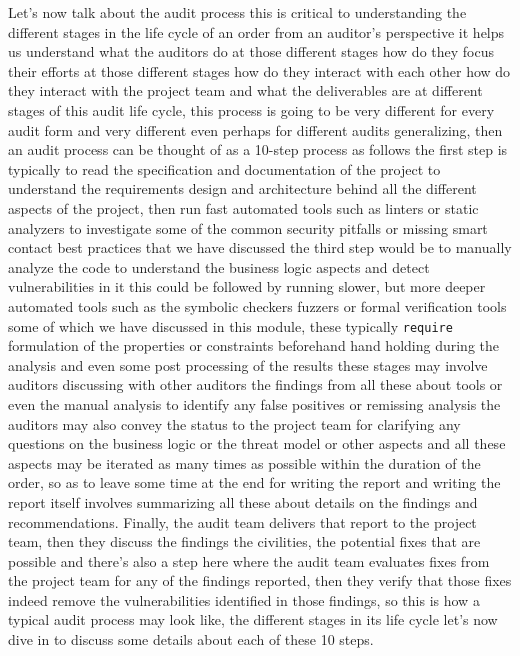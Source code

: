 Let's now talk about the audit process this is critical to understanding the different stages in the life cycle of an order from an auditor's perspective it helps us understand what the auditors do at those different stages how do they focus their efforts at those different stages how do they interact with each other how do they interact with the project team and what the deliverables are at different stages of this audit life cycle, this process is going to be very different for every audit form and very different even perhaps for different audits generalizing, then an audit process can be thought of as a 10-step process as follows the first step is typically to read the specification and documentation of the project to understand the requirements design and architecture behind all the different aspects of the project, then run fast automated tools such as linters or static analyzers to investigate some of the common security pitfalls or missing smart contact best practices that we have discussed the third step would be to manually analyze the code to understand the business logic aspects and detect vulnerabilities in it this could be followed by running slower, but more deeper automated tools such as the symbolic checkers fuzzers or formal verification tools some of which we have discussed in this module, these typically \verb|require| formulation of the properties or constraints beforehand hand holding during the analysis and even some post processing of the results these stages may involve auditors discussing with other auditors the findings from all these about tools or even the manual analysis to identify any false positives or remissing analysis the auditors may also convey the status to the project team for clarifying any questions on the business logic or the threat model or other aspects and all these aspects may be iterated as many times as possible within the duration of the order, so as to leave some time at the end for writing the report and writing the report itself involves summarizing all these about details on the findings and recommendations. Finally, the audit team delivers that report to the project team, then they discuss the findings the civilities, the potential fixes that are possible and there's also a step here where the audit team evaluates fixes from the project team for any of the findings reported, then they verify that those fixes indeed remove the vulnerabilities identified in those findings, so this is how a typical audit process may look like, the different stages in its life cycle let's now dive in to discuss some details about each of these 10 steps.

